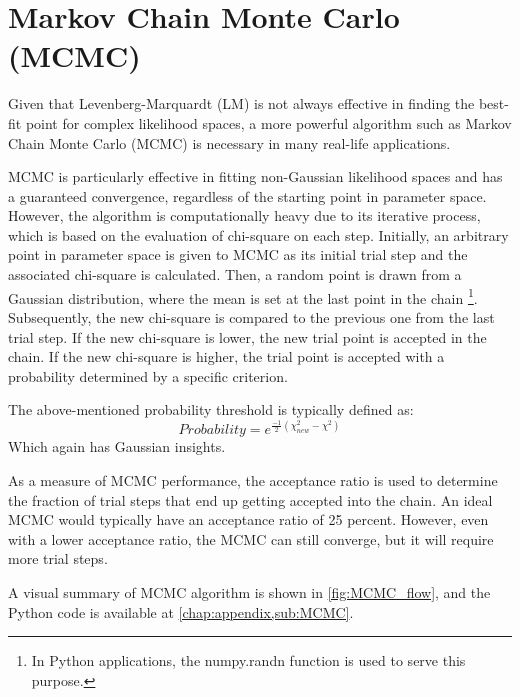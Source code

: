 \documentclass[12pt, TexShade, letterpaper]{report}
\begin{document}
\section{Markov Chain Monte Carlo (MCMC)}
Given that Levenberg-Marquardt (LM) is not always effective in finding the best-fit point for complex likelihood spaces, a more powerful algorithm such as Markov Chain Monte Carlo (MCMC) is necessary in many real-life applications. \par
MCMC is particularly effective in fitting non-Gaussian likelihood spaces and has a guaranteed convergence, regardless of the starting point in parameter space. However, the algorithm is computationally heavy due to its iterative process, which is based on the evaluation of chi-square on each step. Initially, an arbitrary point in parameter space is given to MCMC as its initial trial step and the associated chi-square is calculated. Then, a random point is drawn from a Gaussian distribution, where the mean is set at the last point in the chain \footnote{In Python applications, the numpy.randn function is used to serve this purpose.}. Subsequently, the new chi-square is compared to the previous one from the last trial step. If the new chi-square is lower, the new trial point is accepted in the chain. If the new chi-square is higher, the trial point is accepted with a probability determined by a specific criterion.\par
The above-mentioned probability threshold is typically defined as:
\begin{equation}
    Probability = e^{\frac{-1}{2}(\chi_{new}^2 - \chi^2)}
\end{equation}
Which again has Gaussian insights.\par
As a measure of MCMC performance, the acceptance ratio is used to determine the fraction of trial steps that end up getting accepted into the chain. An ideal MCMC would typically have an acceptance ratio of 25 percent. However, even with a lower acceptance ratio, the MCMC can still converge, but it will require more trial steps.\par
A visual summary of MCMC algorithm is shown in \ref{fig:MCMC_flow}, and the Python code is available at \ref{chap:appendix,sub:MCMC}.
\end{document}
